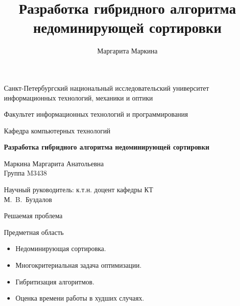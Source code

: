 \documentclass{beamer}
\title[Недоминирующая сортировка]{Разработка гибридного алгоритма недоминирующей сортировки}
\author[Маргарита Маркина]{Маргарита Маркина}
\institute[]{Национальный исследовательский университет информационных технологий, механики и оптики}
\date{}
\begin{document}
\begin{frame}
\begin{center}
{\scriptsize Санкт-Петербургский национальный исследовательский университет \\ информационных технологий, механики и оптики}

\vspace{1cm}

{\scriptsize Факультет информационных технологий и программирования

Кафедра компьютерных технологий}

\vspace{1cm}

\vbox{\large\bfseries
Разработка гибридного алгоритма недоминирующей сортировки}

\vspace{1cm}

{\large Маркина Маргарита Анатольевна \\}
{\large Группа M3438}


\vspace{1cm}

{\large Научный руководитель: к.т.н. доцент кафедры КТ \\}
{\large М.~B.~Буздалов}


\end{center}
\end{frame}


\begin{frame}{Решаемая проблема}
\begin{block}{Предметная область}
\begin{itemize}
\item Недоминирующая сортировка.
\item Многокритериальная задача оптимизации.
\item Гибритизация алгоритмов.
\item Оценка времени работы в худших случаях.
\end{itemize}
\end{block}
\end{frame}
\end{document}
